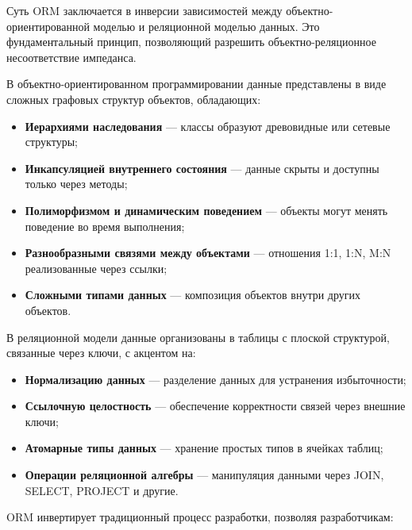 
    
        Суть ORM заключается в инверсии зависимостей между объектно-ориентированной моделью и реляционной моделью данных. Это фундаментальный принцип, позволяющий разрешить объектно-реляционное несоответствие импеданса.
        
        В объектно-ориентированном программировании данные представлены в виде сложных графовых структур объектов, обладающих:
        
        \begin{itemize}
            \item \textbf{Иерархиями наследования} — классы образуют древовидные или сетевые структуры;
            \item \textbf{Инкапсуляцией внутреннего состояния} — данные скрыты и доступны только через методы;
            \item \textbf{Полиморфизмом и динамическим поведением} — объекты могут менять поведение во время выполнения;
            \item \textbf{Разнообразными связями между объектами} — отношения 1:1, 1:N, M:N реализованные через ссылки;
            \item \textbf{Сложными типами данных} — композиция объектов внутри других объектов.
        \end{itemize}
        
        В реляционной модели данные организованы в таблицы с плоской структурой, связанные через ключи, с акцентом на:
        
        \begin{itemize}
            \item \textbf{Нормализацию данных} — разделение данных для устранения избыточности;
            \item \textbf{Ссылочную целостность} — обеспечение корректности связей через внешние ключи;
            \item \textbf{Атомарные типы данных} — хранение простых типов в ячейках таблиц;
            \item \textbf{Операции реляционной алгебры} — манипуляция данными через JOIN, SELECT, PROJECT и другие.
        \end{itemize}
        
        ORM инвертирует традиционный процесс разработки, позволяя разработчикам:
        
